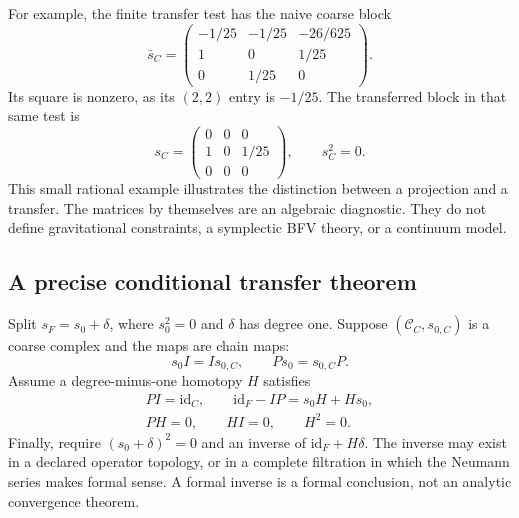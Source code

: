 For example, the finite transfer test has the naive coarse block
\begin{equation}
 \bar s_C=\begin{pmatrix}
 -1/25&-1/25&-26/625\\
 1&0&1/25\\
 0&1/25&0
 \end{pmatrix}.
\end{equation}
Its square is nonzero, as its $(2,2)$ entry is $-1/25$. The transferred block in that same test is
\begin{equation}
 s_C=\begin{pmatrix}0&0&0\\1&0&1/25\\0&0&0\end{pmatrix},
 \qquad s_C^2=0.
\end{equation}
This small rational example illustrates the distinction between a projection and a transfer. The matrices by themselves are an algebraic diagnostic. They do not define gravitational constraints, a symplectic BFV theory, or a continuum model.

\subsection{A precise conditional transfer theorem}
Split $s_F=s_0+\delta$, where $s_0^2=0$ and $\delta$ has degree one. Suppose $(\mathcal C_C,s_{0,C})$ is a coarse complex and the maps are chain maps:
\begin{equation}
 s_0I=Is_{0,C},\qquad Ps_0=s_{0,C}P.
\end{equation}
Assume a degree-minus-one homotopy $H$ satisfies
\begin{equation}
 \begin{gathered}
 PI=\mathrm{id}_C,\qquad
 \mathrm{id}_F-IP=s_0H+Hs_0,\\
 PH=0,\qquad HI=0,\qquad H^2=0.
 \end{gathered}
 \label{c:constraints:contraction}
\end{equation}
Finally, require $(s_0+\delta)^2=0$ and an inverse of $\mathrm{id}_F+H\delta$. The inverse may exist in a declared operator topology, or in a complete filtration in which the Neumann series makes formal sense. A formal inverse is a formal conclusion, not an analytic convergence theorem.

